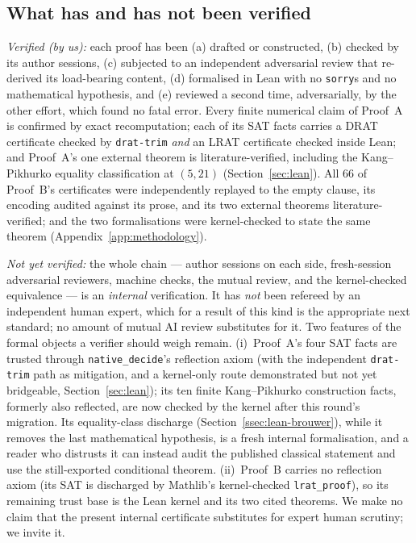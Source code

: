 \documentclass[11pt,reqno]{amsart}
\theoremstyle{definition}
\theoremstyle{remark}
\begin{document}
\subsection{What has and has not been verified}
\emph{Verified (by us):} each proof has been (a) drafted or constructed, (b) checked by
its author sessions, (c) subjected to an independent adversarial review that re-derived
its load-bearing content, (d) formalised in Lean with no \texttt{sorry}s and no
mathematical hypothesis, and (e) reviewed a second time, adversarially, by the other
effort, which found no fatal error. Every finite numerical claim of Proof~A is confirmed
by exact recomputation; each of its SAT facts carries a DRAT certificate checked by
\texttt{drat-trim} \emph{and} an LRAT certificate checked inside Lean; and Proof~A's one
external theorem is literature-verified, including the Kang--Pikhurko equality
classification at $(5,21)$ (Section~\ref{sec:lean}). All $66$ of Proof~B's certificates
were independently replayed to the empty clause, its encoding audited against its prose,
and its two external theorems literature-verified; and the two formalisations were
kernel-checked to state the same theorem (Appendix~\ref{app:methodology}).

\emph{Not yet verified:} the whole chain --- author sessions on each side, fresh-session
adversarial reviewers, machine checks, the mutual review, and the kernel-checked
equivalence --- is an \emph{internal} verification. It has \emph{not} been refereed by an
independent human expert, which for a result of this kind is the appropriate next
standard; no amount of mutual AI review substitutes for it. Two features of the formal
objects a verifier should weigh remain. (i)~Proof~A's four SAT facts are trusted through
\texttt{native\_decide}'s reflection axiom (with the independent \texttt{drat-trim} path as
mitigation, and a kernel-only route demonstrated but not yet bridgeable,
Section~\ref{sec:lean}); its ten finite Kang--Pikhurko construction facts, formerly also
reflected, are now checked by the kernel after this round's migration. Its equality-class
discharge (Section~\ref{ssec:lean-brouwer}), while it removes the last mathematical
hypothesis, is a fresh internal formalisation, and a reader who distrusts it can instead
audit the published classical statement and use the still-exported conditional theorem.
(ii)~Proof~B carries no reflection axiom (its SAT is discharged by Mathlib's
kernel-checked \texttt{lrat\_proof}), so its remaining trust base is the Lean kernel and
its two cited theorems. We make no claim that the present internal certificate substitutes
for expert human scrutiny; we invite it.
\end{document}
